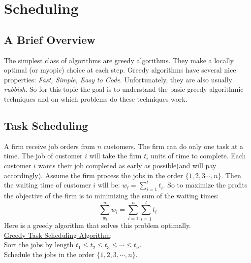 \documentclass[11pt, a4paper, oneside]{book}
\theoremstyle{theoremdd}
\theoremstyle{remark}
\begin{document}
\chapter{Scheduling}
\section{A Brief Overview}
The simplest class of algorithms are greedy algorithms. They make a locally optimal (or myopic) choice at each step. Greedy algorithms have several nice properties: \textit{Fast, Simple, Easy to Code}. Unfortunately, they are also usually \textit{rubbish}. So for this topic the goal is to understand the basic greedy algorithmic techniques and on which problems do these techniques work.

\section{Task Scheduling}
A firm receive job orders from $n$ customers. The firm can do only one task at a time. The job of customer $i$ will take the firm $t_{i}$ units of time to complete. Each customer $i$ wants their job completed as early as possible(and will pay accordingly). Assume the firm process the jobs in the order $\{1,2,3\cdots,n\}$. Then the waiting time of customer $i$ will be: $w_{l}=\sum_{i=1}^{l}t_{i}$. So to maximize the profits the objective of the firm is to minimizing the sum of the waiting times: 
\[
\sum_{w_{l}}^{n}w_{l}=\sum_{l=1}^{n} \sum_{i=1}^{l} t_{i}
\]
Here is a greedy algorithm that solves this problem optimally. \\
\underline{Greedy Task Scheduling Algorithm}: \\
Sort the jobs by length $t_{1}\leq t_{2}\leq t_{3}\leq \cdots \leq t_{n}$. 
\\Schedule the jobs in the order $\{1,2,3,\cdots,n\}$.
\end{document}
